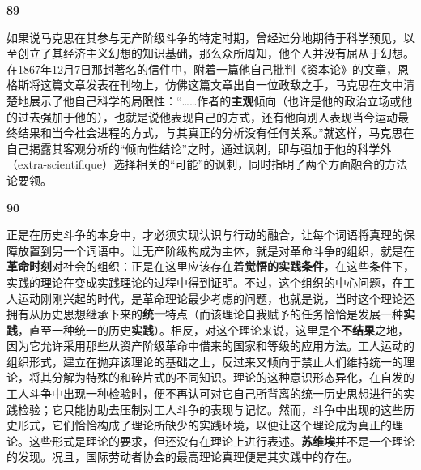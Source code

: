 \documentclass[fontset=fandol, a4paper, 12pt, openright]{ctexbook}
\makeatletter
\newcommand{\thesis}[1]{%
    \par\vspace{1.5em}%
    {\centering \textbf{\Large #1}\par}%
    \nobreak\vspace{0.5em}\nobreak
    \@afterindenttrue %
    \@afterheading    %
}
\makeatother
\begin{document}
\thesis{89}
如果说马克思在其参与无产阶级斗争的特定时期，曾经过分地期待于科学预见，以至创立了其经济主义幻想的知识基础，那么众所周知，他个人并没有屈从于幻想。在1867年12月7日那封著名的信件中，附着一篇他自己批判《资本论》的文章，恩格斯将这篇文章发表在刊物上，仿佛这篇文章出自一位政敌之手，马克思在文中清楚地展示了他自己科学的局限性：“……作者的\textbf{主观}倾向（也许是他的政治立场或他的过去强加于他的），也就是说他表现自己的方式，还有他向别人表现当今运动最终结果和当今社会进程的方式，与其真正的分析没有任何关系。”就这样，马克思在自己揭露其客观分析的“倾向性结论”之时，通过讽刺，即与强加于他的科学外（extra-scientifique）选择相关的“可能”的讽刺，同时指明了两个方面融合的方法论要领。

\thesis{90}
正是在历史斗争的本身中，才必须实现认识与行动的融合，让每个词语将真理的保障放置到另一个词语中。让无产阶级构成为主体，就是对革命斗争的组织，就是在\textbf{革命时刻}对社会的组织：正是在这里应该存在着\textbf{觉悟的实践条件}，在这些条件下，实践的理论在变成实践理论的过程中得到证明。不过，这个组织的中心问题，在工人运动刚刚兴起的时代，是革命理论最少考虑的问题，也就是说，当时这个理论还拥有从历史思想继承下来的\textbf{统一}特点（而该理论自我赋予的任务恰恰是发展一种\textbf{实践}，直至一种统一的历史\textbf{实践}）。相反，对这个理论来说，这里是个\textbf{不结果}之地，因为它允许采用那些从资产阶级革命中借来的国家和等级的应用方法。工人运动的组织形式，建立在抛弃该理论的基础之上，反过来又倾向于禁止人们维持统一的理论，将其分解为特殊的和碎片式的不同知识。理论的这种意识形态异化，在自发的工人斗争中出现一种检验时，便不再认可对它自己所背离的统一历史思想进行的实践检验；它只能协助去压制对工人斗争的表现与记忆。然而，斗争中出现的这些历史形式，它们恰恰构成了理论所缺少的实践环境，以便让这个理论成为真正的理论。这些形式是理论的要求，但还没有在理论上进行表述。\textbf{苏维埃}并不是一个理论的发现。况且，国际劳动者协会的最高理论真理便是其实践中的存在。
\end{document}
